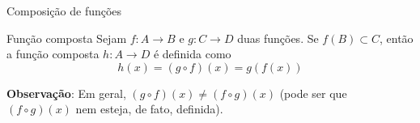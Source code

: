 \begin{frame}[fragile]{Composição de funções}

    \begin{block}{Função composta}
        Sejam $f: A\to B$ e $g: C\to D$ duas funções. Se $f(B)\subset C$, então a função
            composta $h: A\to D$ é definida como
        \[
            h(x) = (g\circ f)(x) = g(f(x))
        \]
    \end{block}

    \vspace{0.2in}

    \textbf{Observação}: Em geral, $(g\circ f)(x) \neq (f\circ g)(x)$ (pode ser que $(f\circ g)(x)$
        nem esteja, de fato, definida).

\end{frame}
